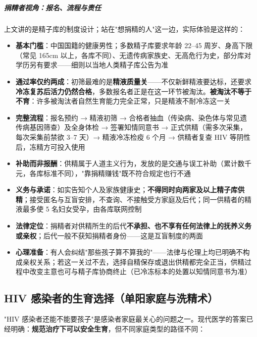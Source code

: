 \subparagraph{捐精者视角：报名、流程与责任}

上文讲的是精子库的制度设计；站在"想捐精的人"这一边，实际体验是这样的：

\begin{itemize}
	\item \textbf{基本门槛}：中国国籍的健康男性；多数精子库要求年龄 22--45 周岁、身高下限（常见 165cm 以上，各库不同）、无遗传病家族史、无高危行为史，部分库对学历另有要求——细则以当地人类精子库公告为准
	\item \textbf{通过率仅约两成}：初筛最难的是\textbf{精液质量关}——不仅新鲜精液要达标，还要求\textbf{冷冻复苏后活力仍然合格}，多数报名者正是在这一环节被淘汰。\textbf{被淘汰不等于不育}：许多被淘汰者自然生育能力完全正常，只是精液不耐冷冻这一关
	\item \textbf{完整流程}：报名预约 → 精液初筛 → 合格者抽血（传染病、染色体与常见遗传病基因筛查）及全身体检 → 签署知情同意书 → 正式供精（需多次采集，每次采集前禁欲 3--7 天）→ 精液冷冻检疫 6 个月 → 供精者复查 HIV 等阴性后，冻精方可投入使用
	\item \textbf{补助而非报酬}：供精属于人道主义行为，发放的是交通与误工补助（累计数千元，各库标准不同），"靠捐精赚钱"既不符合规定也行不通
	\item \textbf{义务与承诺}：如实告知个人及家族健康史；\textbf{不得同时向两家及以上精子库供精}；接受匿名与互盲安排，不查询、不接触受方家庭及后代；同一供精者的精液最多使 5 名妇女受孕，由各库联网控制
	\item \textbf{法律定位}：捐精者对供精所生的后代\textbf{不承担、也不享有任何法律上的抚养义务或亲权}；后代一般不获知捐精者身份——这是互盲制度的两面
	\item \textbf{心理准备}：有人会纠结"那些孩子算不算我的"——法律与伦理上均已明确不构成亲权关系；若这一关过不去，选择自精保存或退出供精都完全正当，供精过程中改变主意也可与精子库协商终止（已冷冻标本的处置以知情同意书为准）
\end{itemize}

\subsection{HIV 感染者的生育选择（单阳家庭与洗精术）}

"HIV 感染者还能不能要孩子"是感染者家庭最关心的问题之一。现代医学的答案已经明确：\textbf{规范治疗下可以安全生育}，但不同家庭类型的路径不同：

